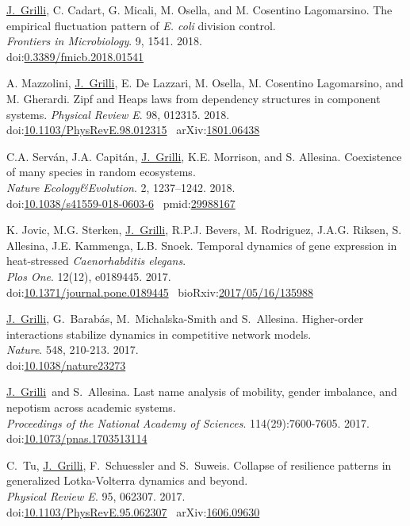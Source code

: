 \documentclass[10pt]{article}
\newcommand\JG{\underline{J.~Grilli}}
\newcommand\doilink[1]{\href{http://dx.doi.org/#1}{#1}}
\newcommand\doi[1]{doi:\doilink{#1}}
\newcommand\pmidlink[1]{\href{http://www.ncbi.nlm.nih.gov/pubmed?term=#1}{#1}}
\newcommand\pmid[1]{pmid:\pmidlink{#1}}
\newcommand\arxivlink[1]{\href{http://arxiv.org/abs/#1}{#1}}
\newcommand\arxiv[1]{arXiv:\arxivlink{#1}}
\newcommand\bioarxivlink[1]{\href{http://biorxiv.org/content/early/#1}{#1}}
\newcommand\bioarxiv[1]{bioRxiv:\bioarxivlink{#1}}
\begin{document}
\begin{bibenum}
    \item \JG, C. Cadart, G. Micali, M. Osella, and M. Cosentino Lagomarsino.
	The empirical fluctuation pattern of \textit{E. coli} division control. \\
    \emph{Frontiers in Microbiology}. 9, 1541. 2018.
    \\
    \doi{0.3389/fmicb.2018.01541} 

    \item A. Mazzolini, \JG, E. De Lazzari, M. Osella, M. Cosentino Lagomarsino, and M. Gherardi.
    Zipf and Heaps laws from dependency structures in component systems.
    \emph{Physical Review E}. 98, 012315. 2018.    \\
    \doi{10.1103/PhysRevE.98.012315} \
	\arxiv{1801.06438}


    \item C.A. Serv\'an, J.A. Capit\'an, \JG, K.E. Morrison, and S. Allesina.
	Coexistence of many species in random ecosystems. \\
    \emph{Nature Ecology\&Evolution}. 2, 1237–1242. 2018.
    \\
    \doi{10.1038/s41559-018-0603-6} \
    \pmid{29988167}

    \item K. Jovic, M.G. Sterken, \JG, R.P.J. Bevers, M. Rodriguez, J.A.G. Riksen, S. Allesina, J.E. Kammenga, L.B. Snoek.
	Temporal dynamics of gene expression in heat-stressed \textit{Caenorhabditis elegans}. \\
    \emph{Plos One}. 12(12), e0189445. 2017.
    \\
    \doi{10.1371/journal.pone.0189445} \
	\bioarxiv{2017/05/16/135988}	

    \item \JG, G.~Barab\'as, M.~Michalska-Smith and S.~Allesina.
	Higher-order interactions stabilize dynamics in competitive network models. \\
    \emph{Nature}. 548, 210-213. 2017. \\
    \doi{10.1038/nature23273} 

    \item \JG \ and S.~Allesina.
	Last name analysis of mobility, gender imbalance, and nepotism across academic systems. \\
    \emph{Proceedings of the National Academy of Sciences}. 114(29):7600-7605. 2017. \\
    \doi{10.1073/pnas.1703513114} 

    \item C.~Tu, \JG, F.~Schuessler and S.~Suweis.
	Collapse of resilience patterns in generalized Lotka-Volterra dynamics and beyond. \\
    \emph{Physical Review E}.  95, 062307. 2017.    \\
    \doi{10.1103/PhysRevE.95.062307} \
	\arxiv{1606.09630}	


\end{bibenum}
\end{document}
